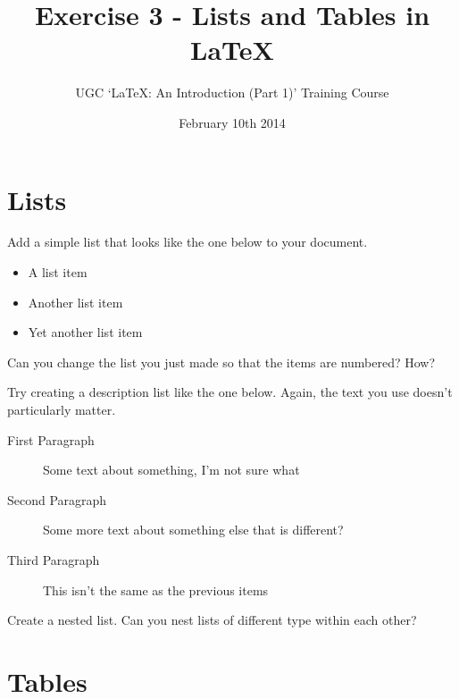 \documentclass[11pt]{exam}
\title{Exercise 3 - Lists and Tables in \LaTeX}
\author{UGC `\LaTeX: An Introduction (Part 1)' Training Course}
\date{February 10th 2014}
\begin{document}
\maketitle


\vspace{0.2in}

\section{Lists}

\begin{questions}

\question
Add a simple list that looks like the one below to your document.

\begin{itemize}
	\item A list item
	\item Another list item
	\item Yet another list item
\end{itemize}


\question
Can you change the list you just made so that the items are numbered? How?

\question
Try creating a description list like the one below. Again, the text you use doesn't particularly matter.

\vspace{0.1in}
\begin{minipage}[ht!]{0.4\textwidth}
\begin{description}
	\item[First Paragraph] Some text about something, I'm not sure what
	\item[Second Paragraph] Some more text about something else that is different?
	\item[Third Paragraph] This isn't the same as the previous items
\end{description}
\end{minipage}

\question
Create a nested list. Can you nest lists of different type within each other?

\end{questions}

\section{Tables}
\end{document}
